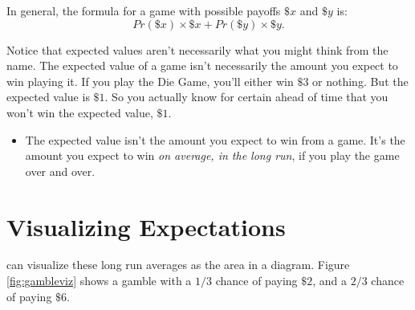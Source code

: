 \documentclass[justified]{tufte-book}
\newcommand{\p}{Pr}
\newenvironment{warning}{\begin{itemize}\item[\faBan]}{\end{itemize}}
\theoremstyle{definition}
\theoremstyle{definition}
\theoremstyle{definition}
\theoremstyle{remark}
\begin{document}
In general, the formula for a game with possible payoffs \(\$x\) and \(\$y\) is:
\[ \p(\$x) \times \$x + \p(\$y) \times \$y. \]

Notice that expected values aren't necessarily what you might think from the name. The expected value of a game isn't necessarily the amount you expect to win playing it. If you play the Die Game, you'll either win \(\$3\) or nothing. But the expected value is \(\$1\). So you actually know for certain ahead of time that you won't win the expected value, \(\$1\).

\begin{warning}
The expected value isn't the amount you expect to win from a game. It's
the amount you expect to win \emph{on average, in the long run}, if you
play the game over and over.
\end{warning}

\hypertarget{visualizing-expectations}{%
\section{Visualizing Expectations}\label{visualizing-expectations}}

 can visualize these long run averages as the area in a diagram. Figure \ref{fig:gambleviz} shows a gamble with a \(1/3\) chance of paying \(\$2\), and a \(2/3\) chance of paying \(\$6\).
\end{document}
